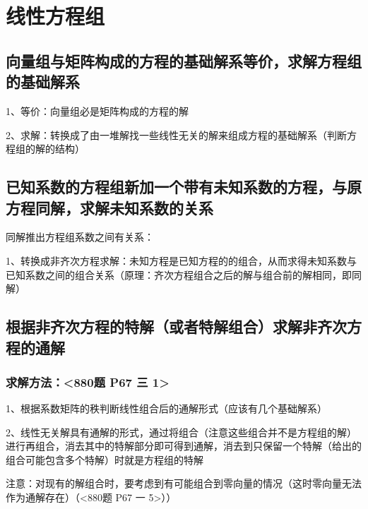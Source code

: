 \chapter{线性方程组}

\section{向量组与矩阵构成的方程的基础解系等价，求解方程组的基础解系}

1、等价：向量组必是矩阵构成的方程的解

2、求解：转换成了由一堆解找一些线性无关的解来组成方程的基础解系（判断方程组的解的结构）



\section{已知系数的方程组新加一个带有未知系数的方程，与原方程同解，求解未知系数的关系}

同解推出方程组系数之间有关系：

1、转换成非齐次方程求解：未知方程是已知方程的的组合，从而求得未知系数与已知系数之间的组合关系（原理：齐次方程组合之后的解与组合前的解相同，即同解）

\section{根据非齐次方程的特解（或者特解组合）求解非齐次方程的通解}



\subsection{求解方法：<880题 P67 三 1>}

1、根据系数矩阵的秩判断线性组合后的通解形式（应该有几个基础解系）

2、线性无关解具有通解的形式，通过将组合（注意这些组合并不是方程组的解）进行再组合，消去其中的特解部分即可得到通解，消去到只保留一个特解（给出的组合可能包含多个特解）时就是方程组的特解

注意：对现有的解组合时，要考虑到有可能组合到零向量的情况（这时零向量无法作为通解存在）（<880题 P67 一 5>））



